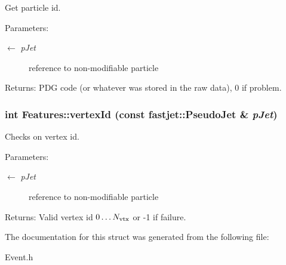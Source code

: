 Get particle id. 

\begin{Desc}
\item[Parameters:]
\begin{description}
\item[\mbox{$\leftarrow$} {\em p\-Jet}]reference to non-modifiable particle\end{description}
\end{Desc}
\begin{Desc}
\item[Returns:]PDG code (or whatever was stored in the raw data), 0 if problem. \end{Desc}
\hypertarget{structFeatures_0c8e4fd93e1b6d00c75294f79689294a}{
\subsubsection[vertexId]{\setlength{\rightskip}{0pt plus 5cm}int Features::vertex\-Id (const fastjet::Pseudo\-Jet \& {\em p\-Jet})}}
\label{structFeatures_0c8e4fd93e1b6d00c75294f79689294a}


Checks on vertex id. 

\begin{Desc}
\item[Parameters:]
\begin{description}
\item[\mbox{$\leftarrow$} {\em p\-Jet}]reference to non-modifiable particle\end{description}
\end{Desc}
\begin{Desc}
\item[Returns:]Valid vertex id $0\ldots N_{\rm vtx}$ or -1 if failure. \end{Desc}


The documentation for this struct was generated from the following file:\begin{CompactItemize}
\item 
Event.h\end{CompactItemize}
